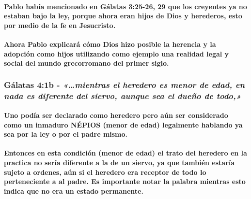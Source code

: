 \documentclass[11a pt,twoside]{article}
\newcommand{\scripture}[1]{%
  {\fontsize{12pt}{16pt}\selectfont\ScriptureFont\itshape #1}%
}
\let\oldsubsubsection\subsubsection
\renewcommand{\subsubsection}{\needspace{4\baselineskip}\oldsubsubsection}
\let\oldparagraph\paragraph
\renewcommand{\paragraph}{\needspace{3\baselineskip}\oldparagraph}
\begin{document}
\paragraph{Pablo había mencionado en Gálatas 3:25-26, 29 que los
creyentes ya no estaban bajo la ley, porque ahora eran hijos de Dios y
herederos, esto por medio de la fe en
Jesucristo.}\label{pablo-habuxeda-mencionado-en-guxe1latas-325-26-29-que-los-creyentes-ya-no-estaban-bajo-la-ley-porque-ahora-eran-hijos-de-dios-y-herederos-esto-por-medio-de-la-fe-en-jesucristo.}

\paragraph{Ahora Pablo explicará cómo Dios hizo posible la herencia y la
adopción como hijos utilizando como ejemplo una realidad legal y social
del mundo grecorromano del primer
siglo.}\label{ahora-pablo-explicaruxe1-cuxf3mo-dios-hizo-posible-la-herencia-y-la-adopciuxf3n-como-hijos-utilizando-como-ejemplo-una-realidad-legal-y-social-del-mundo-grecorromano-del-primer-siglo.}

\subsubsection{\texorpdfstring{Gálatas 4:1b -
\scripture{«…mientras el heredero es menor de edad, en nada es diferente del siervo, aunque sea el dueño de todo,»}}{Gálatas 4:1b - }}\label{guxe1latas-41b---mientras-el-heredero-es-menor-de-edad-en-nada-es-diferente-del-siervo-aunque-sea-el-dueuxf1o-de-todo}

\paragraph{Uno podía ser declarado como heredero pero aún ser
considerado como un inmaduro NÉPIOS (menor de edad) legalmente hablando
ya sea por la ley o por el padre
mismo.}\label{uno-poduxeda-ser-declarado-como-heredero-pero-auxfan-ser-considerado-como-un-inmaduro-nuxe9pios-menor-de-edad-legalmente-hablando-ya-sea-por-la-ley-o-por-el-padre-mismo.}

\paragraph{Entonces en esta condición (menor de edad) el trato del
heredero en la practica no sería diferente a la de un siervo, ya que
también estaría sujeto a ordenes, aún si el heredero era receptor de
todo lo perteneciente a al padre. Es importante notar la palabra
mientras esto indica que no era un estado
permanente.}\label{entonces-en-esta-condiciuxf3n-menor-de-edad-el-trato-del-heredero-en-la-practica-no-seruxeda-diferente-a-la-de-un-siervo-ya-que-tambiuxe9n-estaruxeda-sujeto-a-ordenes-auxfan-si-el-heredero-era-receptor-de-todo-lo-perteneciente-a-al-padre.-es-importante-notar-la-palabra-mientras-esto-indica-que-no-era-un-estado-permanente.}
\end{document}
